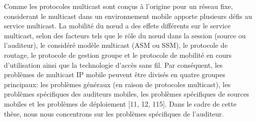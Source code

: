 Comme les protocoles multicast sont conçus à l'origine pour un réseau fixe, considerant le multicast dans un environnement mobile apporte plusieurs défis au service multicast. La mobilité du nœud a des effets différents sur le service multicast, selon des facteurs tels que le rôle du nœud dans la session (source ou l'auditeur), le considéré modèle multicast (ASM ou SSM), le protocole de routage, le protocole de gestion groupe et le protocole de mobilité en cours d'utilisation ainsi que la technologie d'accès sans fil. Par conséquent, les problèmes de multicast IP mobile peuvent être divisés en quatre groupes principaux: les problèmes généraux (en raison de protocoles multicast), les problèmes spécifiques des auditeurs mobiles, les problèmes spécifiques de sources mobiles et les problèmes de déploiement [11, 12, 115]. Dans le cadre de cette thèse, nous nous concentrons sur les problèmes spécifiques de l'auditeur.

